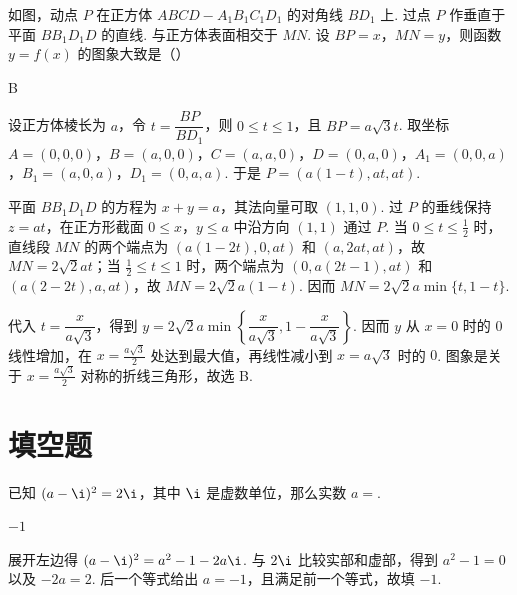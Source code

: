 \begin{problem}
如图，动点 \(P\) 在正方体 \(ABCD - A_{1}B_{1}C_{1}D_{1}\) 的对角线 \(BD_{1}\) 上. 过点 \(P\) 作垂直于平面 \(BB_{1}D_{1}D\) 的直线. 与正方体表面相交于 \(MN\). 设 \(BP = x\)，\(MN = y\)，则函数 \(y = f(x)\) 的图象大致是（\quad）


    {}
    {}
    {}

\begin{answer}
B
\end{answer}

\begin{solution}
设正方体棱长为 \(a\)，令 \(t=\dfrac{BP}{BD_1}\)，则 \(0\leqslant t\leqslant1\)，且 \(BP=a\sqrt3t\). 取坐标 \(A=(0,0,0)\)，\(B=(a,0,0)\)，\(C=(a,a,0)\)，\(D=(0,a,0)\)，\(A_1=(0,0,a)\)，\(B_1=(a,0,a)\)，\(D_1=(0,a,a)\). 于是 \(P=(a(1-t),at,at)\).

平面 \(BB_1D_1D\) 的方程为 \(x+y=a\)，其法向量可取 \((1,1,0)\). 过 \(P\) 的垂线保持 \(z=at\)，在正方形截面 \(0\leqslant x\)，\(y\leqslant a\) 中沿方向 \((1,1)\) 通过 \(P\). 当 \(0\leqslant t\leqslant\frac12\) 时，直线段 \(MN\) 的两个端点为 \((a(1-2t),0,at)\) 和 \((a,2at,at)\)，故 \(MN=2\sqrt2at\)；当 \(\frac12\leqslant t\leqslant1\) 时，两个端点为 \((0,a(2t-1),at)\) 和 \((a(2-2t),a,at)\)，故 \(MN=2\sqrt2a(1-t)\). 因而 \(MN=2\sqrt2a\min\{t,1-t\}\).

代入 \(t=\dfrac{x}{a\sqrt3}\)，得到 \(y=2\sqrt2a\min\left\{\dfrac{x}{a\sqrt3},1-\dfrac{x}{a\sqrt3}\right\}\). 因而 \(y\) 从 \(x=0\) 时的 \(0\) 线性增加，在 \(x=\frac{a\sqrt3}{2}\) 处达到最大值，再线性减小到 \(x=a\sqrt3\) 时的 \(0\). 图象是关于 \(x=\frac{a\sqrt3}{2}\) 对称的折线三角形，故选 B.
\end{solution}
\end{problem}

\section{填空题}

\begin{problem}
已知 \((a - \i)^2 = 2\i\)，其中 \(\i\) 是虚数单位，那么实数 \(a = \)\fillinblank{}.

\begin{answer}
\(-1\)
\end{answer}

\begin{solution}
展开左边得 \((a-\i)^2=a^2-1-2a\i\). 与 \(2\i\) 比较实部和虚部，得到 \(a^2-1=0\) 以及 \(-2a=2\). 后一个等式给出 \(a=-1\)，且满足前一个等式，故填 \(-1\).
\end{solution}
\end{problem}

